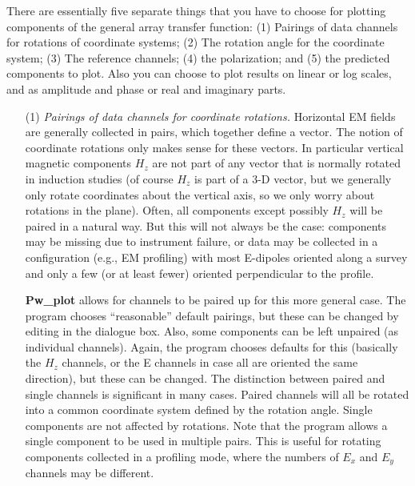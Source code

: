 There are essentially five separate things that you have to choose for plotting
components of the general array transfer function: (1) Pairings of
data channels for rotations of coordinate systems; (2) The rotation
angle for the coordinate system; (3) The reference channels;
(4) the polarization; and (5) the predicted components to plot.
Also you can choose to plot results on linear or log scales, and as amplitude
and phase or real and imaginary parts.

\begin{itemize}

\item[(1)]
{\it Pairings of data channels for coordinate rotations.}  Horizontal EM
fields are generally collected in pairs, which together define a vector.
The notion of coordinate rotations only makes sense for these vectors.
In particular vertical magnetic components $H_z$ are not part of any 
vector that is normally rotated in induction studies (of course $H_z$
is part of a 3-D vector, but we generally only rotate coordinates
about the vertical axis, so we only worry about rotations in the plane).
Often, all components except possibly $H_z$ will be paired in a natural
way.  But this will not always be the case: components may be missing due
to instrument failure, or data may be collected in a configuration
(e.g., EM profiling) with most E-dipoles oriented along a survey
and only a few (or at least fewer) oriented perpendicular to the profile.

{\bf Pw\_plot} allows for channels to be paired up for this more general
case.  The program chooses ``reasonable'' default pairings, but these
can be changed by editing in the dialogue box.  Also, some components
can be left unpaired (as individual channels).  Again, the program
chooses defaults for this (basically the $H_z$ channels, or the E
channels in case all are oriented the same direction), but these can
be changed.  The distinction between paired and single channels is
significant in many cases.  Paired channels will all be rotated into
a common coordinate system defined by the rotation angle.  Single components
are not affected by rotations.  Note that the program allows a single
component to be used in multiple pairs.  This is useful for rotating
components collected in a profiling mode, where the numbers of $E_x$ and
$E_y$ channels may be different. 


\end{itemize}
